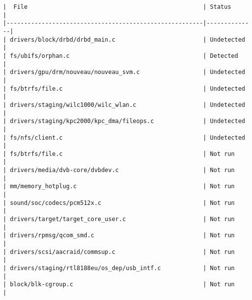 \begin{verbatim}
|  File                                                  | Status       | 
|--------------------------------------------------------|--------------|
| drivers/block/drbd/drbd_main.c                         | Undetected   | 
| fs/ubifs/orphan.c                                      | Detected     | 
| drivers/gpu/drm/nouveau/nouveau_svm.c                  | Undetected   | 
| fs/btrfs/file.c                                        | Undetected   | 
| drivers/staging/wilc1000/wilc_wlan.c                   | Undetected   | 
| drivers/staging/kpc2000/kpc_dma/fileops.c              | Undetected   | 
| fs/nfs/client.c                                        | Undetected   | 
| fs/btrfs/file.c                                        | Not run      | 
| drivers/media/dvb-core/dvbdev.c                        | Not run      | 
| mm/memory_hotplug.c                                    | Not run      | 
| sound/soc/codecs/pcm512x.c                             | Not run      | 
| drivers/target/target_core_user.c                      | Not run      | 
| drivers/rpmsg/qcom_smd.c                               | Not run      | 
| drivers/scsi/aacraid/commsup.c                         | Not run      | 
| drivers/staging/rtl8188eu/os_dep/usb_intf.c            | Not run      | 
| block/blk-cgroup.c                                     | Not run      | 
\end{verbatim}